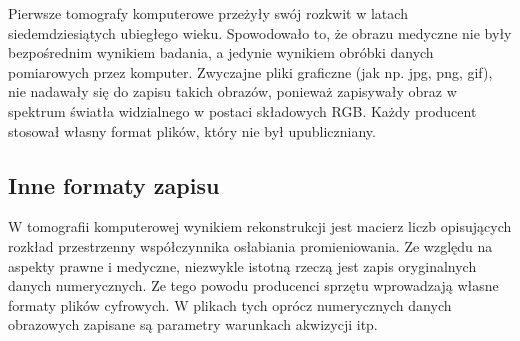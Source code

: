 
\par
Pierwsze tomografy komputerowe przeżyły swój rozkwit w latach siedemdziesiątych ubiegłego wieku.
Spowodowało to, że obrazu medyczne nie były bezpośrednim wynikiem badania, a jedynie wynikiem obróbki danych pomiarowych przez komputer.
Zwyczajne pliki graficzne (jak np. jpg, png, gif), nie nadawały się do zapisu takich obrazów, ponieważ zapisywały obraz w spektrum światła widzialnego w postaci składowych RGB.
Każdy producent stosował  własny format plików, który nie był upubliczniany.



\subsection{Inne formaty zapisu}

\par
W tomografii komputerowej wynikiem rekonstrukcji jest macierz liczb opisujących rozkład przestrzenny współczynnika osłabiania promieniowania.
Ze względu na aspekty prawne i medyczne, niezwykle istotną rzeczą jest zapis oryginalnych danych numerycznych. Ze tego powodu producenci sprzętu wprowadzają własne formaty plików cyfrowych.
W plikach tych oprócz numerycznych danych obrazowych zapisane są parametry warunkach akwizycji itp.